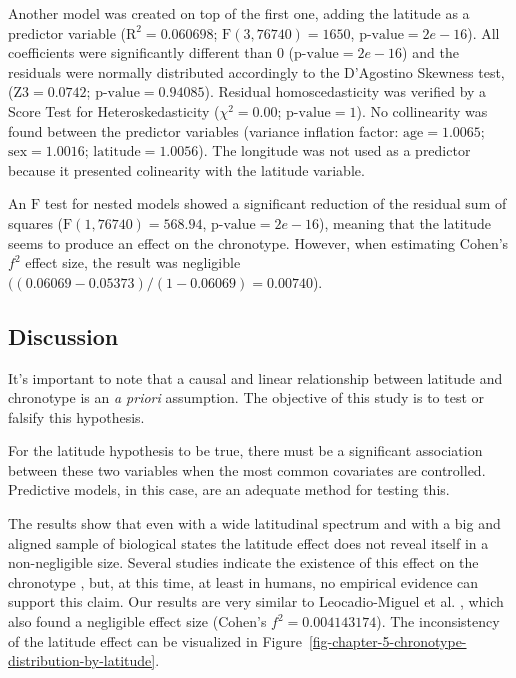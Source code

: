 \documentclass[
12pt,
openright,
oneside,
a4paper,
chapter=TITLE,
section=TITLE,
french,
spanish,
brazil,
english
]{abntex2}\usepackage{array}
\begin{document}
Another model was created on top of the first one, adding the latitude
as a predictor variable (\(\text{R}^{2} = 0.060698\);
\(\text{F}(3, 76740) = 1650\), \(\text{p-value} = 2e-16\)). All
coefficients were significantly different than 0
(\(\text{p-value} = 2e-16\)) and the residuals were normally distributed
accordingly to the D'Agostino Skewness test, (\(\text{Z3} = 0.0742\);
\(\text{p-value} = 0.94085\)). Residual homoscedasticity was verified by
a Score Test for Heteroskedasticity (\(\chi^{2} = 0.00\);
\(\text{p-value} = 1\)). No collinearity was found between the predictor
variables (variance inflation factor: \(\text{age} = 1.0065\);
\(\text{sex} = 1.0016\); \(\text{latitude} = 1.0056\)). The longitude
was not used as a predictor because it presented colinearity with the
latitude variable.

An \(\text{F}\) test for nested models showed a significant reduction of
the residual sum of squares (\(\text{F}(1, 76740) = 568.94\),
\(\text{p-value} = 2e-16\)), meaning that the latitude seems to produce
an effect on the chronotype. However, when estimating Cohen's \(f^2\)
effect size, the result was negligible \autocite{cohen1992}
\(((0.06069 - 0.05373) / (1 - 0.06069) = 0.00740\)).

\subsection{Discussion}\label{discussion}

It's important to note that a causal and linear relationship between
latitude and chronotype is an \emph{a priori} assumption. The objective
of this study is to test or falsify this hypothesis.

For the latitude hypothesis to be true, there must be a significant
association between these two variables when the most common covariates
are controlled. Predictive models, in this case, are an adequate method
for testing this.

The results show that even with a wide latitudinal spectrum and with a
big and aligned sample of biological states the latitude effect does not
reveal itself in a non-negligible size. Several studies indicate the
existence of this effect on the chronotype
\autocite{hut2013,leocadio-miguel2017,pittendrigh1991,randler2008,randler2017,roenneberg2003},
but, at this time, at least in humans, no empirical evidence can support
this claim. Our results are very similar to Leocadio-Miguel et al.
\autocite*{leocadio-miguel2017}, which also found a negligible effect
size (Cohen's \(f^{2} = 0.004143174\)). The inconsistency of the
latitude effect can be visualized in
Figure~\ref{fig-chapter-5-chronotype-distribution-by-latitude}.
\end{document}
